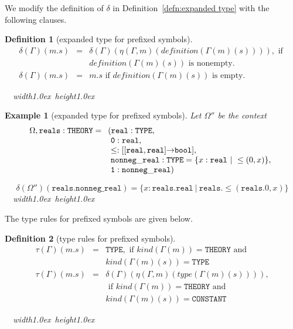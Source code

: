 \documentclass [12pt,twoside]{cslreport}
\newcommand{\thmbox}
   {{\ \hfill\hbox{%
      \vrule width1.0ex height1.0ex
   }\parfillskip 0pt }}
\newtheorem{example}[thm]{Example}
\newcommand{\aro}{\mathord\rightarrow} %
\newcommand{\funtype}[2]{[#1 \aro #2]}
\newcommand{\tupletype}[1]{[#1]}
\newcommand{\tauGamma}[1]{\tau(\Gamma)(#1)}
\newcommand{\ttbool}{\mathtt{bool}}
\newcommand{\ttreal}{\mathtt{real}}
\newcommand{\tttype}{\mathtt{TYPE}}
\newcommand{\ttconstant}{\mathtt{CONSTANT}}
\newcommand{\tttheory}{\mathtt{THEORY}}
\newcommand{\itkind}{\textit{kind}}
\newcommand{\ittype}{\textit{type}}
\newcommand{\itdef}{\textit{definition}}
\newcommand{\vbar}{\ |\ }
\newenvironment{Eg}[1]{\begin{example}[#1]\label{eg:#1}\em }{\thmbox\end{example}}
\newtheorem{definition}{Definition}
\newenvironment{Defn}[1]{\begin{definition}[#1]\label{defn:#1}}{
\thmbox\end{definition}}
\begin{document}
We modify the definition of $\delta$ in Definition~\ref{defn:expanded
type} with the following clauses.  
\begin{Defn}{expanded type for prefixed symbols}
\begin{eqnarray*}
  \delta(\Gamma)(m.s) & = & \delta(\Gamma)(
\eta(\Gamma, m)(\itdef{}(\Gamma(m)(s)))), 
                        \mbox{ if }\\& &  \itdef{}(\Gamma(m)(s)) \mbox{ is
nonempty.}\\
  \delta(\Gamma)(m.s) & = & m.s
                        \mbox{ if } \itdef{}(\Gamma(m)(s)) \mbox{ is
empty.}
\end{eqnarray*}
\end{Defn}
\begin{Eg}{expanded type for prefixed symbols}
Let $\Omega''$ be the context
$$\Omega, 
\mathtt{reals} : \tttheory{} = \begin{array}[t]{l}
				   (\ttreal{} : \tttype{},\\\
                                    \mathtt{0} : \ttreal{},\\\ 
                        \leq : \funtype{\tupletype{\ttreal{},
              \ttreal{}}}{\ttbool}, \\\ 
        \mathtt{nonneg\_real} : \tttype{} = \{x : \ttreal{} \vbar
\leq(0, x)\},\\\  \mathtt{1} : \mathtt{nonneg\_real} )
				   \end{array}$$

$$\delta(\Omega'')( \mathtt{reals.nonneg\_real}) =
\{ {x} : \mathtt{reals.real} \vbar
\mathtt{reals}.\!\leq( \mathtt{reals.0}, {x})\}$$
\end{Eg}

The type rules for prefixed symbols are given below.
\begin{Defn}{type rules for prefixed symbols}
\begin{eqnarray*}
  \tauGamma{m.s} & = & \tttype{}, \mbox{ if } \itkind{}(\Gamma(m)) =
\tttheory{} \mbox{ and }\\ & &
\itkind{}(\Gamma(m)(s)) = \tttype{}\\
%
  \tauGamma{m.s} & = & \delta(\Gamma)(\eta(\Gamma, m)(\ittype(\Gamma(m)(s)))), \\ &
&
\mbox{ if } \itkind{}(\Gamma(m)) =
\tttheory{} \mbox{ and }\\ & &
\itkind{}(\Gamma(m)(s)) = \ttconstant{}
\end{eqnarray*}
\end{Defn}
\end{document}
